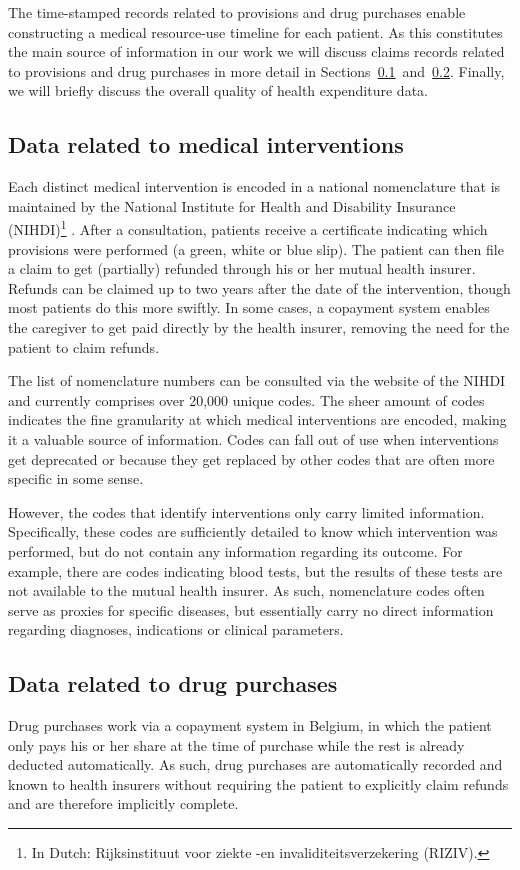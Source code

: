 The time-stamped records related to provisions and drug purchases enable constructing a medical resource-use timeline for each patient. As this constitutes the main source of information in our work we will discuss claims records related to provisions and drug purchases in more detail in Sections~\ref{intro:interventions}~and~\ref{intro:drugs}. Finally, we will briefly discuss the overall quality of health expenditure data.


\subsection{Data related to medical interventions} \label{intro:interventions}
Each distinct medical intervention is encoded in a national nomenclature that is maintained by the National Institute for Health and Disability Insurance (NIHDI)\footnote{In Dutch: Rijksinstituut voor ziekte -en invaliditeitsverzekering (RIZIV).} \citep{van2008financing}. After a consultation, patients receive a certificate indicating which provisions were performed (a green, white or blue slip). The patient can then file a claim to get (partially) refunded through his or her mutual health insurer. Refunds can be claimed up to two years after the date of the intervention, though most patients do this more swiftly. In some cases, a copayment system enables the caregiver to get paid directly by the health insurer, removing the need for the patient to claim refunds.

The list of nomenclature numbers can be consulted via the website of the NIHDI and currently comprises over 20,000 unique codes. The sheer amount of codes indicates the fine granularity at which medical interventions are encoded, making it a valuable source of information. Codes can fall out of use when interventions get deprecated or because they get replaced by other codes that are often more specific in some sense.

However, the codes that identify interventions only carry limited information. Specifically, these codes are sufficiently detailed to know which intervention was performed, but do not contain any information regarding its outcome. For example, there are codes indicating blood tests, but the results of these tests are not available to the mutual health insurer. As such, nomenclature codes often serve as proxies for specific diseases, but essentially carry no direct information regarding diagnoses, indications or clinical parameters.

\subsection{Data related to drug purchases} \label{intro:drugs}
Drug purchases work via a copayment system in Belgium, in which the patient only pays his or her share at the time of purchase while the rest is already deducted automatically. As such, drug purchases are automatically recorded and known to health insurers without requiring the patient to explicitly claim refunds and are therefore implicitly complete.

